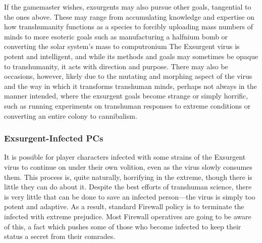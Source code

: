 If the gamemaster wishes, exsurgents may also pursue other goals, tangential to the ones above. These may range from accumulating knowledge and expertise on how transhumanity functions as a species to forcibly uploading mass numbers of minds to more esoteric goals such as manufacturing a halfnium bomb or converting the solar system's mass to computronium The Exsurgent virus is potent and intelligent, and while its methods and goals may sometimes be opaque to transhumanity, it acts with direction and purpose. There may also be occasions, however, likely due to the mutating and morphing aspect of the virus and the way in which it transforms transhuman minds, perhaps not always in the manner intended, where the exsurgent goals become strange or simply horrific, such as running experiments on transhuman responses to extreme conditions or converting an entire colony to cannibalism. 

\subsubsection{Exsurgent-Infected PCs} 

It is possible for player characters infected with some strains of the Exsurgent virus to continue on under their own volition, even as the virus slowly consumes them. This process is, quite naturally, horrifying in the extreme, though there is little they can do about it. Despite the best efforts of transhuman science, there is very little that can be done to save an infected person—the virus is simply too potent and adaptive. As a result, standard Firewall policy is to terminate the infected with extreme prejudice. Most Firewall operatives are going to be aware of this, a fact which pushes some of those who become infected to keep their status a secret from their comrades. 

